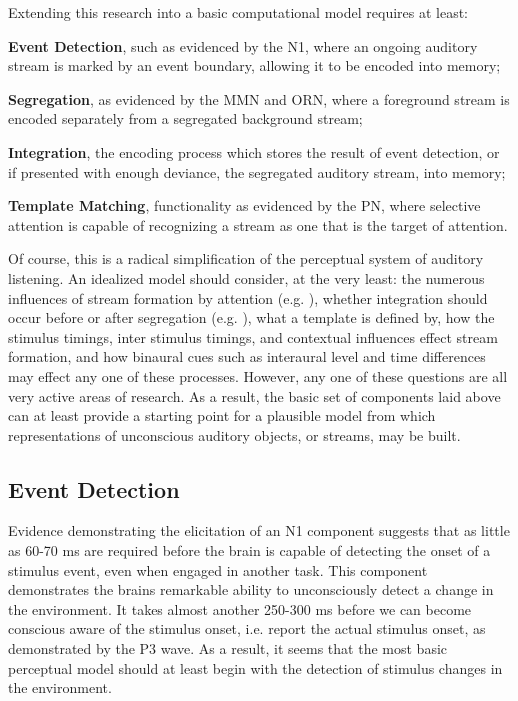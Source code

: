 \documentclass[a4paper,10pt,final]{ThesisStyle}
\begin{document}
Extending this research into a basic computational model requires at least: 
\begin{enumerateb}
\item \textbf{Event Detection}, such as evidenced by the N1, where an ongoing auditory stream is marked by an event boundary, allowing it to be encoded into memory; 
\item \textbf{Segregation}, as evidenced by the MMN and ORN, where a foreground stream is encoded separately from a segregated background stream;
\item \textbf{Integration}, the encoding process which stores the result of event detection, or if presented with enough deviance, the segregated auditory stream, into memory;
\item \textbf{Template Matching}, functionality as evidenced by the PN, where selective attention is capable of recognizing a stream as one that is the target of attention. 
\end{enumerateb}
Of course, this is a radical simplification of the perceptual system of auditory listening.   An idealized model should consider, at the very least: the numerous influences of stream formation by attention (e.g. \cite{Shamma2011}), whether integration should occur before or after segregation (e.g. \cite{Sussman2005}), what a template is defined by, how the stimulus timings, inter stimulus timings, and contextual influences effect stream formation, and how binaural cues such as interaural level and time differences may effect any one of these processes.  However, any one of these questions are all very active areas of research.  As a result, the basic set of components laid above can at least provide a starting point for a plausible model from which representations of unconscious auditory objects, or streams, may be built.  

\subsection{Event Detection}

Evidence demonstrating the elicitation of an N1 component suggests that as little as 60-70 ms are required before the brain is capable of detecting the onset of a stimulus event, even when engaged in another task.  This component demonstrates the brains remarkable ability to unconsciously detect a change in the environment.  It takes almost another 250-300 ms before we can become conscious aware of the stimulus onset, i.e. report the actual stimulus onset, as demonstrated by the P3 wave.  As a result, it seems that the most basic perceptual model should at least begin with the detection of stimulus changes in the environment.  
\end{document}
